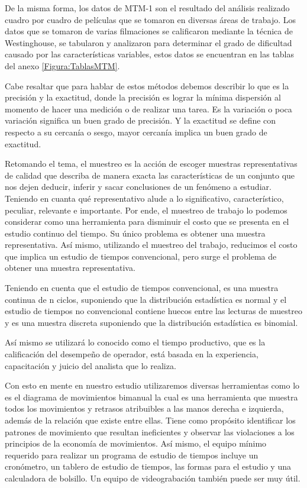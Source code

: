     De la misma forma, los datos de MTM-1 son el resultado del análisis realizado cuadro por cuadro de películas que se tomaron en diversas áreas de trabajo. Los datos que se tomaron de varias filmaciones se calificaron mediante la técnica de Westinghouse, se tabularon y analizaron para determinar el grado de dificultad causado por las características variables, estos datos se encuentran en las tablas del anexo \ref{Figura:TablasMTM}. \cite{niebel1980ingenieria}
    
    
    Cabe resaltar que para hablar de estos métodos debemos describir lo que es la precisión y la exactitud, donde la precisión es lograr la mínima dispersión al momento de hacer una medición o de realizar una tarea. Es la variación o poca variación significa un buen grado de precisión. Y la exactitud se define con respecto a su cercanía o sesgo, mayor cercanía implica un buen grado de exactitud.
    
    Retomando el tema, el muestreo es la acción de escoger muestras representativas de calidad que describa de manera exacta las características de un conjunto que nos dejen deducir, inferir y sacar conclusiones de un fenómeno a estudiar. \cite{RAE} Teniendo en cuanta qué representativo alude a lo significativo, característico, peculiar, relevante e importante. \cite{RAE}
    Por ende, el muestreo de trabajo lo podemos considerar como una herramienta para disminuir el costo que se presenta  en el estudio continuo del tiempo. Su único problema es obtener una muestra representativa. Así mismo, utilizando el muestreo del trabajo, reducimos el costo que implica un estudio de tiempos convencional, pero surge el problema de obtener una muestra representativa.
    
    Teniendo en cuenta que el estudio de tiempos convencional, es una muestra continua de n ciclos, suponiendo que la distribución estadística es normal y el estudio de tiempos no convencional contiene huecos entre las lecturas de muestreo y es una muestra discreta suponiendo que la distribución estadística es binomial.
    
    
    Así mismo se utilizará lo conocido como el tiempo productivo, que es la calificación del desempeño de operador, está basada en la experiencia, capacitación y juicio del analista que lo realiza.
    
    
    Con esto en mente en nuestro estudio utilizaremos diversas herramientas como lo es el diagrama de movimientos bimanual la cual es una herramienta que muestra todos los movimientos y retrasos atribuibles a las manos derecha e izquierda, además de la relación que existe entre ellas. Tiene como propósito identificar los patrones de movimiento que resultan ineficientes y observar las violaciones a los principios de la economía de movimientos.\cite{niebel1980ingenieria} Así mismo, el equipo mínimo requerido para realizar un programa de estudio de tiempos incluye un cronómetro, un tablero de estudio de tiempos, las formas para el estudio y una calculadora de bolsillo. Un equipo de videograbación también puede ser muy útil.
    
